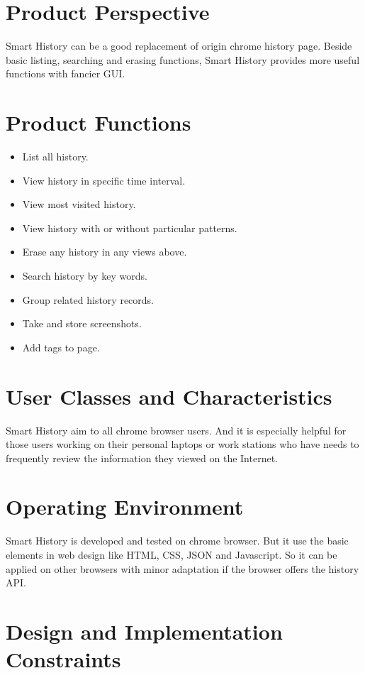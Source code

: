 \documentclass[a5paper]{scrreprt}
\begin{document}
\section{Product Perspective}

Smart History can be a good replacement of origin chrome history page. Beside basic 
listing, searching and erasing functions, Smart History provides more useful functions 
with fancier GUI.

\section{Product Functions}

\begin{itemize}[label={\checkmark}]
	\item List all history.
	\item View history in specific time interval.
	\item View most visited history.
	\item View history with or without particular patterns.
	\item Erase any history in any views above.
	\item Search history by key words.
	\item Group related history records.
	\item Take and store screenshots.
	\item Add tags to page.
\end{itemize}

\section{User Classes and Characteristics}

Smart History aim to all chrome browser users. And it is especially helpful 
for those users working on their personal laptops or work stations who have needs 
to frequently review the information they viewed on the Internet.

\section{Operating Environment}

Smart History is developed and tested on chrome browser. But it use the basic
elements in web design like HTML, CSS, JSON and Javascript. So it can be applied
on other browsers with minor adaptation if the browser offers the history API.

\section{Design and Implementation Constraints}
\end{document}
